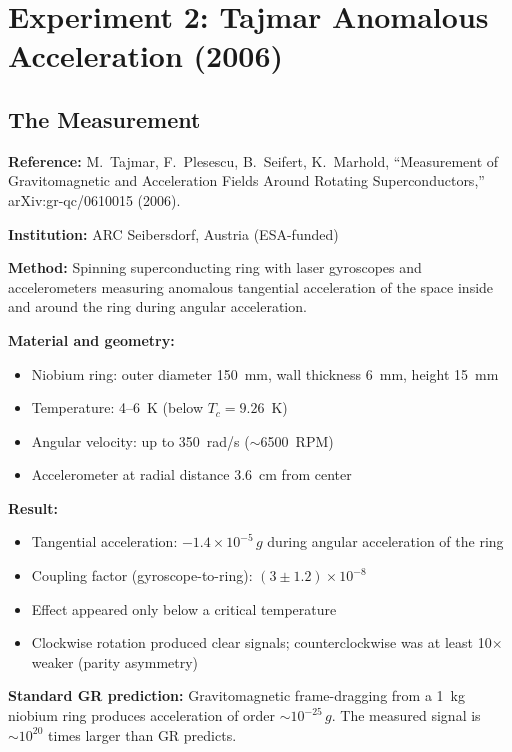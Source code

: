 \documentclass[11pt, a4paper]{article}
\begin{document}
\section{Experiment 2: Tajmar Anomalous Acceleration (2006)}

\subsection{The Measurement}

\textbf{Reference:} M.~Tajmar, F.~Plesescu, B.~Seifert, K.~Marhold,
``Measurement of Gravitomagnetic and Acceleration Fields Around
Rotating Superconductors,'' arXiv:gr-qc/0610015 (2006).

\textbf{Institution:} ARC Seibersdorf, Austria (ESA-funded)

\textbf{Method:} Spinning superconducting ring with laser
gyroscopes and accelerometers measuring anomalous tangential
acceleration of the space inside and around the ring during
angular acceleration.

\textbf{Material and geometry:}
\begin{itemize}[nosep]
  \item Niobium ring: outer diameter 150~mm, wall thickness 6~mm,
        height 15~mm
  \item Temperature: 4--6~K (below $T_c = 9.26$~K)
  \item Angular velocity: up to 350~rad/s ($\sim$6500~RPM)
  \item Accelerometer at radial distance 3.6~cm from center
\end{itemize}

\textbf{Result:}
\begin{itemize}[nosep]
  \item Tangential acceleration: $-1.4 \times 10^{-5}\,g$ during
        angular acceleration of the ring
  \item Coupling factor (gyroscope-to-ring): $(3 \pm 1.2) \times 10^{-8}$
  \item Effect appeared only below a critical temperature
  \item Clockwise rotation produced clear signals; counterclockwise
        was at least 10$\times$ weaker (parity asymmetry)
\end{itemize}

\textbf{Standard GR prediction:} Gravitomagnetic frame-dragging from
a 1~kg niobium ring produces acceleration of order
$\sim 10^{-25}\,g$. The measured signal is $\sim 10^{20}$ times
larger than GR predicts.
\end{document}
